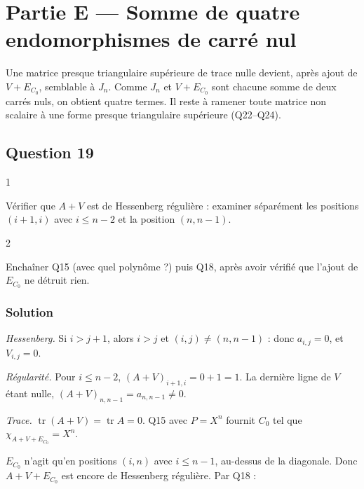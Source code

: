 \documentclass[11pt,a4paper]{article}
\begin{document}
\hypertarget{partie-e-somme-de-quatre-endomorphismes-de-carruxe9-nul}{%
\section{Partie E --- Somme de quatre endomorphismes de carré nul}\label{partie-e-somme-de-quatre-endomorphismes-de-carruxe9-nul}}

Une matrice presque triangulaire supérieure de trace nulle devient, après ajout de \(V+E_{C_0}\), semblable à \(J_n\). Comme \(J_n\) et \(V+E_{C_0}\) sont chacune somme de deux carrés nuls, on obtient quatre termes. Il reste à ramener toute matrice non scalaire à une forme presque triangulaire supérieure (Q22--Q24).

\hypertarget{question-19}{%
\subsection{Question 19}\label{question-19}}

\begin{indication}{1}

Vérifier que \(A+V\) est de Hessenberg régulière : examiner séparément les positions \((i+1,i)\) avec \(i\leqslant n-2\) et la position \((n,n-1)\).

\end{indication}

\begin{indication}{2}

Enchaîner Q15 (avec quel polynôme ?) puis Q18, après avoir vérifié que l'ajout de \(E_{C_0}\) ne détruit rien.

\end{indication}

\hypertarget{solution-18}{%
\subsubsection{Solution}\label{solution-18}}

\emph{Hessenberg.} Si \(i>j+1\), alors \(i>j\) et \((i,j)\neq(n,n-1)\) : donc \(a_{i,j}=0\), et \(V_{i,j}=0\).

\emph{Régularité.} Pour \(i\leqslant n-2\), \((A+V)_{i+1,i}=0+1=1\). La dernière ligne de \(V\) étant nulle, \((A+V)_{n,n-1}=a_{n,n-1}\neq0\).

\emph{Trace.} \(\operatorname{tr}(A+V)=\operatorname{tr}A=0\). Q15 avec \(P=X^n\) fournit \(C_0\) tel que \(\chi_{A+V+E_{C_0}}=X^n\).

\(E_{C_0}\) n'agit qu'en positions \((i,n)\) avec \(i\leqslant n-1\), au-dessus de la diagonale. Donc \(A+V+E_{C_0}\) est encore de Hessenberg régulière. Par Q18 :
\end{document}
